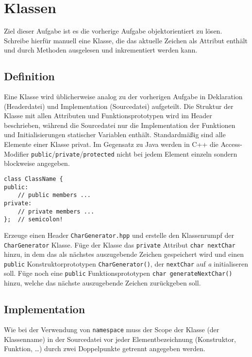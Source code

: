 \section{Klassen}
Ziel dieser Aufgabe ist es die vorherige Aufgabe objektorientiert zu lösen. Schreibe hierfür manuell eine Klasse, die das aktuelle Zeichen als Attribut enthält und durch Methoden ausgelesen und inkrementiert werden kann.


\subsection{Definition}
Eine Klasse wird üblicherweise analog zu der vorherigen Aufgabe in Deklaration (Headerdatei) und Implementation (Sourcedatei) aufgeteilt.
Die Struktur der Klasse mit allen Attributen und Funktionsprototypen wird im Header beschrieben, während die Sourcedatei nur die Implementation der Funktionen und Initialisierungen statischer Variablen enthält.
Standardmäßig sind alle Elemente einer Klasse privat.
Im Gegensatz zu Java werden in C++ die Access-Modifier \texttt{public}/\texttt{private}/\texttt{protected} nicht bei jedem Element einzeln sondern blockweise angegeben.

\begin{lstlisting}
class ClassName {
public:
	// public members ...
private:
	// private members ...
};	// semicolon!
\end{lstlisting}

Erzeuge einen Header \texttt{CharGenerator.hpp} und erstelle den Klassenrumpf der \texttt{CharGenerator} Klasse.
Füge der Klasse das \texttt{private} Attribut \texttt{char nextChar} hinzu, in dem das als nächstes auszugebende Zeichen gespeichert wird und einen \texttt{public} Konstruktorprototypen \texttt{CharGenerator()}, der \texttt{nextChar} auf \emph{a} initialiseren soll.
Füge noch eine \texttt{public} Funktionsprototypen \texttt{char generateNextChar()} hinzu, welche das nächste auszugebende Zeichen zurückgeben soll.



\subsection{Implementation}
Wie bei der Verwendung von \texttt{namespace} muss der Scope der Klasse (der Klassenname) in der Sourcedatei vor jeder Elementbezeichnung (Konstruktor, Funktion, \dots) durch zwei Doppelpunkte getrennt angegeben werden.

